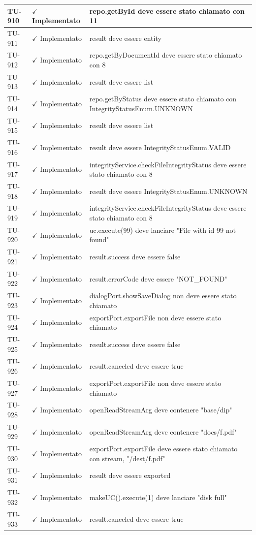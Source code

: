 ﻿\documentclass[a4paper,12pt]{article}
\newcommand{\ok}{\textcolor{green!60!black}{$\checkmark$ Implementato}}
\begin{document}
\begin{longtable}{|p{2cm}|p{3.5cm}|p{9.5cm}|}
\hline
TU-910 & \ok & repo.getById deve essere stato chiamato con 11 \\
\hline
TU-911 & \ok & result deve essere entity \\
\hline
TU-912 & \ok & repo.getByDocumentId deve essere stato chiamato con 8 \\
\hline
TU-913 & \ok & result deve essere list \\
\hline
TU-914 & \ok & repo.getByStatus deve essere stato chiamato con IntegrityStatusEnum.UNKNOWN \\
\hline
TU-915 & \ok & result deve essere list \\
\hline
TU-916 & \ok & result deve essere IntegrityStatusEnum.VALID \\
\hline
TU-917 & \ok & integrityService.checkFileIntegrityStatus deve essere stato chiamato con 8 \\
\hline
TU-918 & \ok & result deve essere IntegrityStatusEnum.UNKNOWN \\
\hline
TU-919 & \ok & integrityService.checkFileIntegrityStatus deve essere stato chiamato con 8 \\
\hline
TU-920 & \ok & uc.execute(99) deve lanciare "File with id 99 not found" \\
\hline
TU-921 & \ok & result.success deve essere false \\
\hline
TU-922 & \ok & result.errorCode deve essere "NOT\_FOUND" \\
\hline
TU-923 & \ok & dialogPort.showSaveDialog non deve essere stato chiamato \\
\hline
TU-924 & \ok & exportPort.exportFile non deve essere stato chiamato \\
\hline
TU-925 & \ok & result.success deve essere false \\
\hline
TU-926 & \ok & result.canceled deve essere true \\
\hline
TU-927 & \ok & exportPort.exportFile non deve essere stato chiamato \\
\hline
TU-928 & \ok & openReadStreamArg deve contenere "base/dip" \\
\hline
TU-929 & \ok & openReadStreamArg deve contenere "docs/f.pdf" \\
\hline
TU-930 & \ok & exportPort.exportFile deve essere stato chiamato con stream, "/dest/f.pdf" \\
\hline
TU-931 & \ok & result deve essere exported \\
\hline
TU-932 & \ok & makeUC().execute(1) deve lanciare "disk full" \\
\hline
TU-933 & \ok & result.canceled deve essere true \\

\end{longtable}
\end{document}
